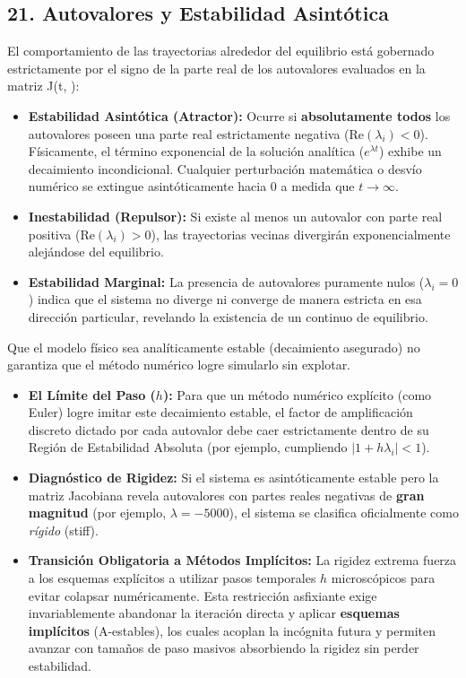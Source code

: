 \documentclass[12pt]{article}
\begin{document}
\subsection*{21. Autovalores y Estabilidad Asintótica}
El comportamiento de las trayectorias alrededor del equilibrio está gobernado estrictamente por el signo de la parte real de los autovalores evaluados en la matriz J(t, ):
\begin{itemize}
    \item \textbf{Estabilidad Asintótica (Atractor):} Ocurre si \textbf{absolutamente todos} los autovalores poseen una parte real estrictamente negativa ($\text{Re}(\lambda_i) < 0$). Físicamente, el término exponencial de la solución analítica ($e^{\lambda t}$) exhibe un decaimiento incondicional. Cualquier perturbación matemática o desvío numérico se extingue asintóticamente hacia $0$ a medida que $t \to \infty$.
    \item \textbf{Inestabilidad (Repulsor):} Si existe al menos un autovalor con parte real positiva ($\text{Re}(\lambda_i) > 0$), las trayectorias vecinas divergirán exponencialmente alejándose del equilibrio.
    \item \textbf{Estabilidad Marginal:} La presencia de autovalores puramente nulos ($\lambda_i = 0$) indica que el sistema no diverge ni converge de manera estricta en esa dirección particular, revelando la existencia de un continuo de equilibrio.
\end{itemize}

Que el modelo físico sea analíticamente estable (decaimiento asegurado) no garantiza que el método numérico logre simularlo sin explotar.
\begin{itemize}
    \item \textbf{El Límite del Paso ($h$):} Para que un método numérico explícito (como Euler) logre imitar este decaimiento estable, el factor de amplificación discreto dictado por cada autovalor debe caer estrictamente dentro de su Región de Estabilidad Absoluta (por ejemplo, cumpliendo $|1 + h\lambda_i| < 1$).
    \item \textbf{Diagnóstico de Rigidez:} Si el sistema es asintóticamente estable pero la matriz Jacobiana revela autovalores con partes reales negativas de \textbf{gran magnitud} (por ejemplo, $\lambda = -5000$), el sistema se clasifica oficialmente como \textit{rígido} (stiff).
    \item \textbf{Transición Obligatoria a Métodos Implícitos:} La rigidez extrema fuerza a los esquemas explícitos a utilizar pasos temporales $h$ microscópicos para evitar colapsar numéricamente. Esta restricción asfixiante exige invariablemente abandonar la iteración directa y aplicar \textbf{esquemas implícitos} (A-estables), los cuales acoplan la incógnita futura y permiten avanzar con tamaños de paso masivos absorbiendo la rigidez sin perder estabilidad.
\end{itemize}
\end{document}
